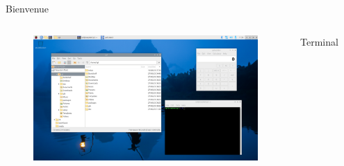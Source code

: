 \documentclass[aspectratio=169,xcolor=dvipsnames]{beamer}
\begin{document}
\begin{frame}{Bienvenue}
    \begin{columns}[c] %

        \begin{figure}
            \includegraphics[width=1\textwidth]{1/rpi-os-welcome.png}
        \end{figure}

        \begin{center}
            Terminal
            \begin{figure}
                \includegraphics[width=0.7\textwidth]{1/terminal.png}
            \end{figure}
            

\end{center}
\end{columns}
\end{frame}
\end{document}
